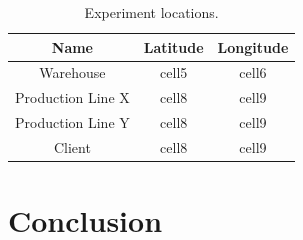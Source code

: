 \documentclass[12pt]{article}
\begin{document}
\begin{table}[H]
\centering
{}
\caption{Mission Flight Time Tested in Real and Virtual UAV.\label{table:tests}}
\end{table}

\begin{table}[H]
\centering
\begin{tabular}{|c|c|c|}
\hline
\bfseries Name & \bfseries Latitude & \bfseries Longitude \\
\hline
Warehouse & cell5 & cell6 \\
\hline
Production Line X & cell8 & cell9 \\
\hline
Production Line Y & cell8 & cell9 \\
\hline
Client & cell8 & cell9 \\
\hline
\end{tabular}
\caption{Experiment locations.}
\label{table:positions}
\end{table}


\section{Conclusion}
\label{sec:conclusao}
\end{document}
